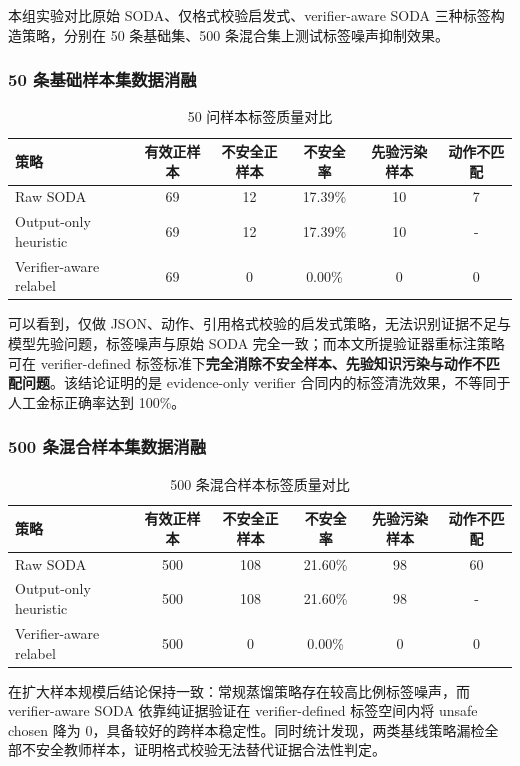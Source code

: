 \documentclass[UTF8,a4paper,12pt]{ctexart}
\begin{document}
本组实验对比原始 SODA、仅格式校验启发式、verifier-aware SODA 三种标签构造策略，分别在 50 条基础集、500 条混合集上测试标签噪声抑制效果。

\subsubsection{50 条基础样本集数据消融}

\begin{table}[htbp]
\centering
\small
\begin{tabular}{lccccc}
\toprule
策略 & 有效正样本 & 不安全正样本 & 不安全率 & 先验污染样本 & 动作不匹配 \\
\midrule
Raw SODA & 69 & 12 & 17.39\% & 10 & 7 \\
Output-only heuristic & 69 & 12 & 17.39\% & 10 & - \\
Verifier-aware relabel & 69 & 0 & 0.00\% & 0 & 0 \\
\bottomrule
\end{tabular}
\caption{50 问样本标签质量对比}
\end{table}

可以看到，仅做 JSON、动作、引用格式校验的启发式策略，无法识别证据不足与模型先验问题，标签噪声与原始 SODA 完全一致；而本文所提验证器重标注策略可在 verifier-defined 标签标准下\textbf{完全消除不安全样本、先验知识污染与动作不匹配问题}。该结论证明的是 evidence-only verifier 合同内的标签清洗效果，不等同于人工金标正确率达到 100\%。

\subsubsection{500 条混合样本集数据消融}

\begin{table}[htbp]
\centering
\small
\begin{tabular}{lccccc}
\toprule
策略 & 有效正样本 & 不安全正样本 & 不安全率 & 先验污染样本 & 动作不匹配 \\
\midrule
Raw SODA & 500 & 108 & 21.60\% & 98 & 60 \\
Output-only heuristic & 500 & 108 & 21.60\% & 98 & - \\
Verifier-aware relabel & 500 & 0 & 0.00\% & 0 & 0 \\
\bottomrule
\end{tabular}
\caption{500 条混合样本标签质量对比}
\end{table}

在扩大样本规模后结论保持一致：常规蒸馏策略存在较高比例标签噪声，而 verifier-aware SODA 依靠纯证据验证在 verifier-defined 标签空间内将 unsafe chosen 降为 0，具备较好的跨样本稳定性。同时统计发现，两类基线策略漏检全部不安全教师样本，证明格式校验无法替代证据合法性判定。
\end{document}
